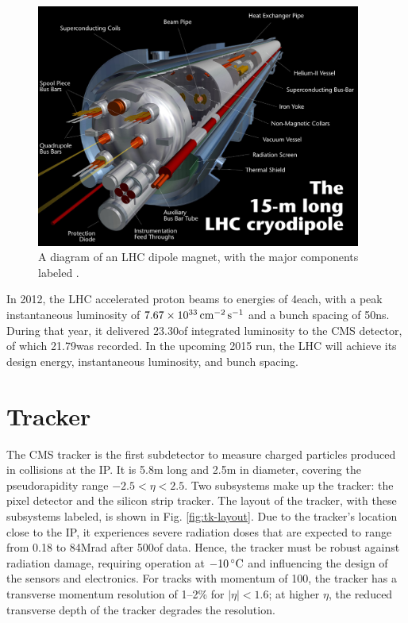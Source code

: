 \begin{figure}[hbt]
\begin{center}
\includegraphics[width=0.95\textwidth]{figures/lhc-pho-1998-299.jpg}
\caption{A diagram of an LHC dipole magnet, with the major components labeled \cite{Dailler:842253}.}
\label{fig:lhc-dipole}
\end{center}
\end{figure}

In 2012, the LHC accelerated proton beams to energies of 4\TeV each, with a peak instantaneous luminosity of $7.67\times10^{33}\,\text{cm}^\text{$-$2}\,\text{s}^\text{$-$1}$ and a bunch spacing of 50\unit{ns}. During that year, it delivered 23.30\fbinv of integrated luminosity to the CMS detector, of which 21.79\fbinv was recorded. In the upcoming 2015 run, the LHC will achieve its design energy, instantaneous luminosity, and bunch spacing.

\section{Tracker}

The CMS tracker is the first subdetector to measure charged particles produced in collisions at the IP. It is 5.8\unit{m} long and 2.5\unit{m} in diameter, covering the pseudorapidity range $-2.5 < \eta < 2.5$. Two subsystems make up the tracker: the pixel detector and the silicon strip tracker. The layout of the tracker, with these subsystems labeled, is shown in Fig. \ref{fig:tk-layout}. Due to the tracker's location close to the IP, it experiences severe radiation doses that are expected to range from 0.18 to 84\unit{Mrad} after 500\fbinv of data. Hence, the tracker must be robust against radiation damage, requiring operation at $-10\,^\circ\text{C}$ and influencing the design of the sensors and electronics. For tracks with momentum of 100\GeV, the tracker has a transverse momentum resolution of 1--2\% for $|\eta|<1.6$; at higher $\eta$, the reduced transverse depth of the tracker degrades the resolution.

